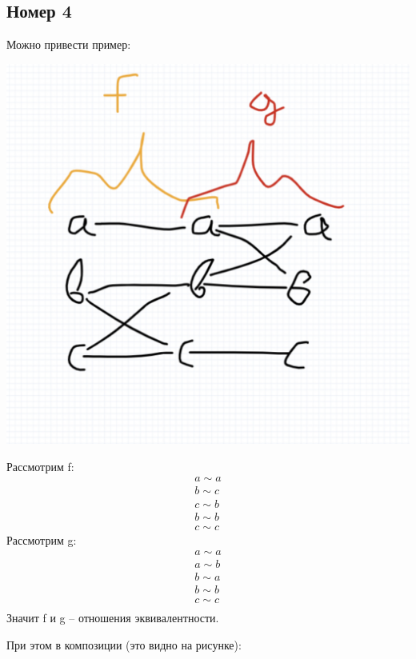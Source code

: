 \documentclass[a4paper,12pt]{article}
\begin{document}
\subsection*{Номер 4}
Можно привести пример:
\begin{center}
\includegraphics[scale=0.2]{abc.png}
\end{center}
Рассмотрим f:
\begin{equation*}
\begin{gathered}
a \sim a\\ b \sim c \\ c \sim b\\ b \sim b \\ c \sim c
\end{gathered}
\end{equation*}
Рассмотрим g:
\begin{equation*}
\begin{gathered}
a \sim a \\ 
a \sim b \\
b \sim a \\
b \sim b\\ 
c \sim c\\
\end{gathered}
\end{equation*}
Значит f и g -- отношения эквивалентности. 

При этом в композиции (это видно на рисунке):
\end{document}
